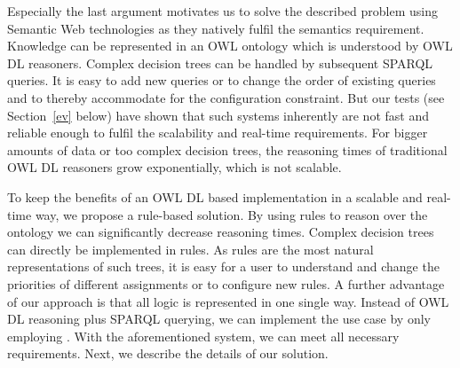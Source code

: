 Especially the last argument motivates us to solve the described problem using Semantic Web technologies as they natively fulfil the semantics requirement.
Knowledge can be represented in an OWL ontology which is understood by OWL DL reasoners. %
Complex decision trees can be handled by subsequent SPARQL queries. It is easy to add new queries or to change the order of existing queries 
and to thereby accommodate for the configuration constraint.
But our tests (see Section~\ref{ev} below) have shown that such systems inherently are not fast and reliable enough to fulfil the scalability and real-time requirements.
For bigger amounts of data or too complex decision trees, the reasoning times of traditional OWL DL reasoners grow exponentially, which is not scalable.

To keep the benefits of an OWL DL based implementation in a scalable and real-time way, we propose a rule-based solution. %
 By using rules to reason over the ontology
 we can significantly decrease reasoning times.
Complex decision trees can directly be implemented in rules. %
 As rules are the most natural representations of such trees, 
 it is easy for a user to understand and change the priorities of different assignments 
 or to configure new rules. A further advantage of our approach is that all logic is represented in one single way. Instead of
 OWL DL reasoning plus SPARQL querying, we can implement the use case by only employing \nthreelogic. With the aforementioned system, we can meet all necessary requirements.
% 
% 
% 
% 
% 
Next, we describe the details of our solution.

